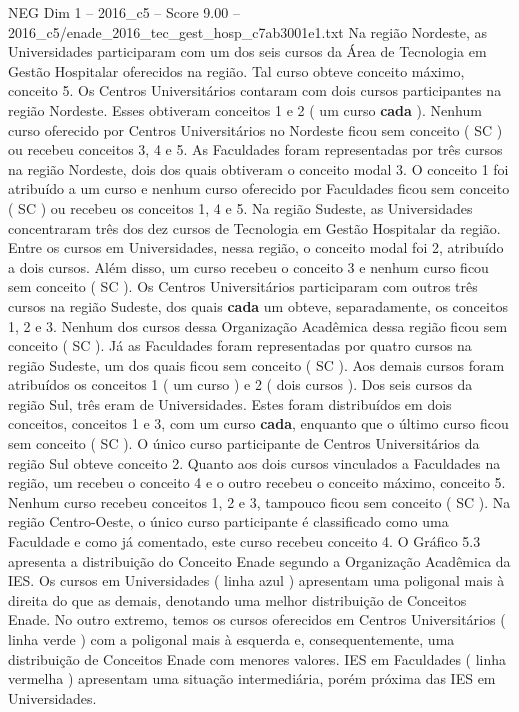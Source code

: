 \begin{textsample}{NEG Dim 1 – 2016\_c5 – Score 9.00 – 2016\_c5/enade\_2016\_tec\_gest\_hosp\_c7ab3001e1.txt}
Na região Nordeste, as Universidades participaram com um dos seis cursos da Área de Tecnologia em Gestão Hospitalar oferecidos na região.
Tal curso obteve conceito máximo, conceito 5.
Os Centros Universitários contaram com dois cursos participantes na região Nordeste.
Esses obtiveram conceitos 1 e 2 ( um curso \textbf{cada} ).
Nenhum curso oferecido por Centros Universitários no Nordeste ficou sem conceito ( SC ) ou recebeu conceitos 3, 4 e 5.
As Faculdades foram representadas por três cursos na região Nordeste, dois dos quais obtiveram o conceito modal 3.
O conceito 1 foi atribuído a um curso e nenhum curso oferecido por Faculdades ficou sem conceito ( SC ) ou recebeu os conceitos 1, 4 e 5.
Na região Sudeste, as Universidades concentraram três dos dez cursos de Tecnologia em Gestão Hospitalar da região.
Entre os cursos em Universidades, nessa região, o conceito modal foi 2, atribuído a dois cursos.
Além disso, um curso recebeu o conceito 3 e nenhum curso ficou sem conceito ( SC ).
Os Centros Universitários participaram com outros três cursos na região Sudeste, dos quais \textbf{cada} um obteve, separadamente, os conceitos 1, 2 e 3.
Nenhum dos cursos dessa Organização Acadêmica dessa região ficou sem conceito ( SC ).
Já as Faculdades foram representadas por quatro cursos na região Sudeste, um dos quais ficou sem conceito ( SC ).
Aos demais cursos foram atribuídos os conceitos 1 ( um curso ) e 2 ( dois cursos ).
Dos seis cursos da região Sul, três eram de Universidades.
Estes foram distribuídos em dois conceitos, conceitos 1 e 3, com um curso \textbf{cada}, enquanto que o último curso ficou sem conceito ( SC ).
O único curso participante de Centros Universitários da região Sul obteve conceito 2.
Quanto aos dois cursos vinculados a Faculdades na região, um recebeu o conceito 4 e o outro recebeu o conceito máximo, conceito 5.
Nenhum curso recebeu conceitos 1, 2 e 3, tampouco ficou sem conceito ( SC ).
Na região Centro-Oeste, o único curso participante é classificado como uma Faculdade e como já comentado, este curso recebeu conceito 4.
O Gráfico 5.3 apresenta a distribuição do Conceito Enade segundo a Organização Acadêmica da IES.
Os cursos em Universidades ( linha azul ) apresentam uma poligonal mais à direita do que as demais, denotando uma melhor distribuição de Conceitos Enade.
No outro extremo, temos os cursos oferecidos em Centros Universitários ( linha verde ) com a poligonal mais à esquerda e, consequentemente, uma distribuição de Conceitos Enade com menores valores.
IES em Faculdades ( linha vermelha ) apresentam uma situação intermediária, porém próxima das IES em Universidades.

\end{textsample}
